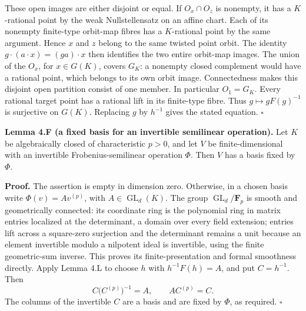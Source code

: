 \documentclass[11pt,a4paper,openany]{report}
\newcounter{none}
\begin{document}
These open images are either disjoint or equal. If \(O_x\cap O_z\) is nonempty, it has a \(K\)-rational point by the weak Nullstellensatz on an affine chart. Each of its nonempty finite-type orbit-map fibres has a \(K\)-rational point by the same argument. Hence \(x\) and \(z\) belong to the same twisted point orbit. The identity \(g\cdot(a\cdot x)=(ga)\cdot x\) then identifies the two entire orbit-map images. The union of the \(O_x\), for \(x\in G(K)\), covers \(G_K\): a nonempty closed complement would have a rational point, which belongs to its own orbit image. Connectedness makes this disjoint open partition consist of one member. In particular \(O_1=G_K\). Every rational target point has a rational lift in its finite-type fibre. Thus \(g\mapsto gF(g)^{-1}\) is surjective on \(G(K)\). Replacing \(g\) by \(h^{-1}\) gives the stated equation. \(\square\)

\textbf{Lemma 4.F (a fixed basis for an invertible semilinear operation).} Let \(K\) be algebraically closed of characteristic \(p>0\), and let \(V\) be finite-dimensional with an invertible Frobenius-semilinear operation \(\Phi\). Then \(V\) has a basis fixed by \(\Phi\).

\textbf{Proof.} The assertion is empty in dimension zero. Otherwise, in a chosen basis write \(\Phi(v)=A v^{(p)}\), with \(A\in\operatorname{GL}_d(K)\). The group \(\operatorname{GL}_d/\mathbf F_p\) is smooth and geometrically connected: its coordinate ring is the polynomial ring in matrix entries localized at the determinant, a domain over every field extension; entries lift across a square-zero surjection and the determinant remains a unit because an element invertible modulo a nilpotent ideal is invertible, using the finite geometric-sum inverse. This proves its finite-presentation and formal smoothness directly. Apply Lemma 4.L to choose \(h\) with \(h^{-1}F(h)=A\), and put \(C=h^{-1}\). Then \[
 C\bigl(C^{(p)}\bigr)^{-1}=A,\qquad A C^{(p)}=C.
\] The columns of the invertible \(C\) are a basis and are fixed by \(\Phi\), as required. \(\square\)

\label{AG-RG-01-height-one-pbw-and-subgroups}
\end{document}
